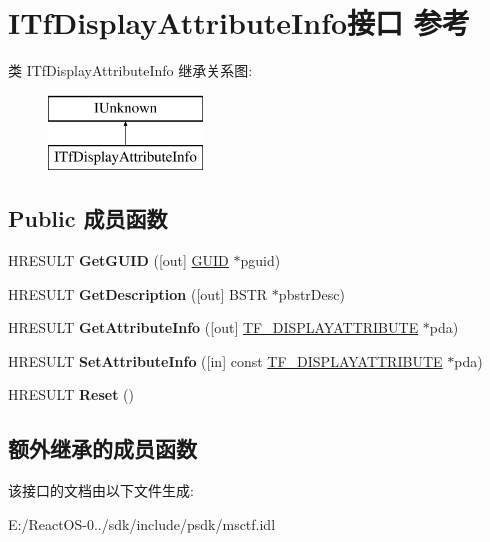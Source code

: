 \hypertarget{interface_i_tf_display_attribute_info}{}\section{I\+Tf\+Display\+Attribute\+Info接口 参考}
\label{interface_i_tf_display_attribute_info}
类 I\+Tf\+Display\+Attribute\+Info 继承关系图\+:\begin{figure}[H]
\begin{center}
\leavevmode
\includegraphics[height=2.000000cm]{interface_i_tf_display_attribute_info}
\end{center}
\end{figure}
\subsection*{Public 成员函数}
\begin{DoxyCompactItemize}
\item 
\mbox{\label{interface_i_tf_display_attribute_info_aad4e53423ee17c9522ec7669bb718107}} 
H\+R\+E\+S\+U\+LT {\bfseries Get\+G\+U\+ID} (\mbox{[}out\mbox{]} \hyperlink{interface_g_u_i_d}{G\+U\+ID} $\ast$pguid)
\item 
\mbox{\label{interface_i_tf_display_attribute_info_a3494a4dca3e1fc8177a7548015353e6d}} 
H\+R\+E\+S\+U\+LT {\bfseries Get\+Description} (\mbox{[}out\mbox{]} B\+S\+TR $\ast$pbstr\+Desc)
\item 
\mbox{\label{interface_i_tf_display_attribute_info_a01bea84c33f794371cbb268faf2c06c7}} 
H\+R\+E\+S\+U\+LT {\bfseries Get\+Attribute\+Info} (\mbox{[}out\mbox{]} \hyperlink{struct_t_f___d_i_s_p_l_a_y_a_t_t_r_i_b_u_t_e}{T\+F\+\_\+\+D\+I\+S\+P\+L\+A\+Y\+A\+T\+T\+R\+I\+B\+U\+TE} $\ast$pda)
\item 
\mbox{\label{interface_i_tf_display_attribute_info_a5ce351fc4e471d8741e02abd55d361da}} 
H\+R\+E\+S\+U\+LT {\bfseries Set\+Attribute\+Info} (\mbox{[}in\mbox{]} const \hyperlink{struct_t_f___d_i_s_p_l_a_y_a_t_t_r_i_b_u_t_e}{T\+F\+\_\+\+D\+I\+S\+P\+L\+A\+Y\+A\+T\+T\+R\+I\+B\+U\+TE} $\ast$pda)
\item 
\mbox{\label{interface_i_tf_display_attribute_info_a9605c95255b41109639a54895afc178a}} 
H\+R\+E\+S\+U\+LT {\bfseries Reset} ()
\end{DoxyCompactItemize}
\subsection*{额外继承的成员函数}


该接口的文档由以下文件生成\+:\begin{DoxyCompactItemize}
\item 
E\+:/\+React\+O\+S-\/0../sdk/include/psdk/msctf.\+idl\end{DoxyCompactItemize}
